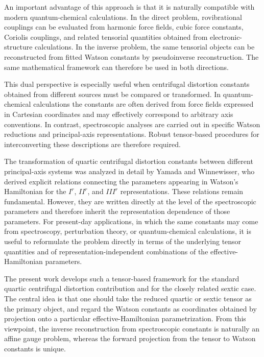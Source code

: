 An important advantage of this approach is that it is naturally
compatible with modern quantum-chemical calculations.  In the direct
problem, rovibrational couplings can be evaluated from harmonic force
fields, cubic force constants, Coriolis couplings, and related
tensorial quantities obtained from electronic-structure calculations.
In the inverse problem, the same tensorial objects can be reconstructed
from fitted Watson constants by pseudoinverse reconstruction.  The same
mathematical framework can therefore be used in both directions.

This dual perspective is especially useful when centrifugal distortion
constants obtained from different sources must be compared or
transformed.  In quantum-chemical calculations the constants are often
derived from force fields expressed in Cartesian coordinates and may
effectively correspond to arbitrary axis conventions.  In contrast,
spectroscopic analyses are carried out in specific Watson reductions
and principal-axis representations.  Robust tensor-based procedures for
interconverting these descriptions are therefore required.

The transformation of quartic centrifugal distortion constants between
different principal-axis systems was analyzed in detail by Yamada and
Winnewisser,\cite{Yamada1976} who derived explicit relations connecting
the parameters appearing in Watson's Hamiltonian for the $I^r$, $II^r$,
and $III^r$ representations.  These relations remain fundamental.
However, they are written directly at the level of the spectroscopic
parameters and therefore inherit the representation dependence of those
parameters.  For present-day applications, in which the same constants
may come from spectroscopy, perturbation theory, or quantum-chemical
calculations, it is useful to reformulate the problem directly in terms
of the underlying tensor quantities and of representation-independent
combinations of the effective-Hamiltonian parameters.\cite{Kirschner1983}

The present work develops such a tensor-based framework for the
standard quartic centrifugal distortion contribution and for the
closely related sextic case.  The central idea is that one should take
the reduced quartic or sextic tensor as the primary object, and regard
the Watson constants as coordinates obtained by projection onto a
particular effective-Hamiltonian parametrization.  From this viewpoint,
the inverse reconstruction from spectroscopic constants is naturally an
affine gauge problem, whereas the forward projection from the tensor to
Watson constants is unique.

